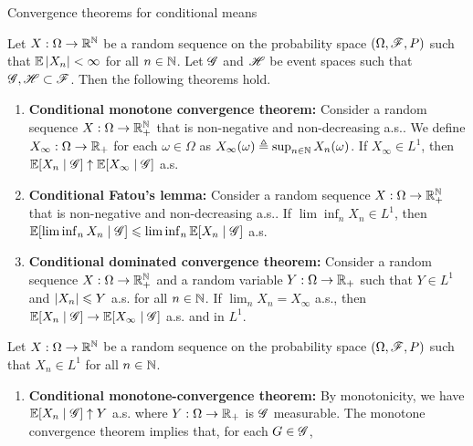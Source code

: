 \documentclass[12pt,aspectratio=169]{beamer}
\begin{document}
\begin{frame}{Convergence theorems for conditional means}
\begin{prop} 
Let $X:\Omega\to\mathbb{R}^{\mathbb{N}}$ be a random sequence on the probability space $(\Omega, \mathscr{F}, P)$ such that $\mathbb{E}\left\lvert X_n\right\rvert < \infty$ for all $n \in \mathbb{N}$.  
Let $\mathscr{G}$ and $\mathscr{H}$ be event spaces such that $\mathscr{G}, \mathscr{H} \subset \mathscr{F}$. 
Then the following theorems hold.
\begin{enumerate}
\item<2-> \textbf{Conditional monotone convergence theorem:} 
Consider a random sequence $X:\Omega\to\mathbb{R}_+^{\mathbb{N}}$ that is non-negative and non-decreasing a.s..
We define $X_\infty:\Omega\to\mathbb{R}_+$ for each $\omega \in \Omega$ as $X_\infty(\omega)\triangleq \sup_{n \in \mathbb{N}}X_n(\omega)$.  
If $X_\infty \in L^1$, then $\mathbb{E}[X_n\mid \mathscr{G}] \uparrow \mathbb{E}[X_\infty\mid\mathscr{G}]$ a.s. 
\end{enumerate}
\end{prop}
\end{frame}

\begin{frame}
\begin{prop}[Continued.]
\begin{enumerate}
\setcounter{enumi}{1}
\item \textbf{Conditional Fatou's lemma:} 
Consider a random sequence $X:\Omega\to\mathbb{R}_+^{\mathbb{N}}$ that is non-negative and non-decreasing a.s.. 
If $\lim\inf_n X_n \in L^1$, then $\mathbb{E}[\lim\inf_nX_n\mid \mathscr{G}] \leqslant \lim\inf_n\mathbb{E}[X_n\mid \mathscr{G}]$ a.s. 

\item<2-> \textbf{Conditional dominated convergence theorem:} 
Consider a random sequence $X:\Omega\to\mathbb{R}_+^{\mathbb{N}}$ and a random variable $Y:\Omega\to\mathbb{R}_+$ such that $Y \in L^1$ and $\left\lvert X_n\right\rvert \leqslant Y$ a.s. for all $n \in  \mathbb{N}$. 
If $\lim_n X_n = X_\infty$ a.s., then $\mathbb{E}[X_n\mid \mathscr{G}] \to  \mathbb{E}[X_\infty\mid\mathscr{G}]$ a.s. and in $L^1$.
\end{enumerate}
\end{prop}
\end{frame}

\begin{frame}
\begin{Proof}
Let $X:\Omega\to\mathbb{R}^{\mathbb{N}}$ be a random sequence on the probability space $(\Omega, \mathscr{F}, P)$ such that $X_n \in L^1$ for all $n \in \mathbb{N}$.  
\begin{enumerate}
\item<2-> \textbf{Conditional monotone-convergence theorem:} 
By monotonicity, we have $\mathbb{E}[X_n\mid \mathscr{G}] \uparrow Y$ a.s. where $Y:\Omega\to \mathbb{R}_+$ is $\mathscr{G}$ measurable. 
The monotone convergence theorem implies that, for each $G \in  \mathscr{G}$,
\end{enumerate}
\end{Proof}
\end{frame}
\end{document}
